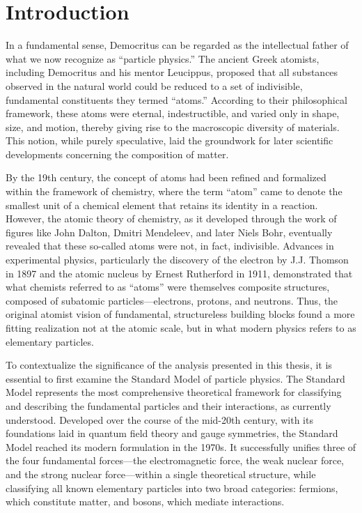 \chapter{Introduction} \label{chap:chap-1}




In a fundamental sense, Democritus can be regarded as the intellectual father of what we now recognize as ``particle physics.'' The ancient Greek atomists, including Democritus and his mentor Leucippus, proposed that all substances observed in the natural world could be reduced to a set of indivisible, fundamental constituents they termed ``atoms.'' According to their philosophical framework, these atoms were eternal, indestructible, and varied only in shape, size, and motion, thereby giving rise to the macroscopic diversity of materials. This notion, while purely speculative, laid the groundwork for later scientific developments concerning the composition of matter.

By the 19th century, the concept of atoms had been refined and formalized within the framework of chemistry, where the term ``atom'' came to denote the smallest unit of a chemical element that retains its identity in a reaction. However, the atomic theory of chemistry, as it developed through the work of figures like John Dalton, Dmitri Mendeleev, and later Niels Bohr, eventually revealed that these so-called atoms were not, in fact, indivisible. Advances in experimental physics, particularly the discovery of the electron by J.J. Thomson in 1897 and the atomic nucleus by Ernest Rutherford in 1911, demonstrated that what chemists referred to as ``atoms'' were themselves composite structures, composed of subatomic particles—electrons, protons, and neutrons. Thus, the original atomist vision of fundamental, structureless building blocks found a more fitting realization not at the atomic scale, but in what modern physics refers to as elementary particles.

To contextualize the significance of the analysis presented in this thesis, it is essential to first examine the Standard Model of particle physics. The Standard Model represents the most comprehensive theoretical framework for classifying and describing the fundamental particles and their interactions, as currently understood. Developed over the course of the mid-20th century, with its foundations laid in quantum field theory and gauge symmetries, the Standard Model reached its modern formulation in the 1970s. It successfully unifies three of the four fundamental forces—the electromagnetic force, the weak nuclear force, and the strong nuclear force—within a single theoretical structure, while classifying all known elementary particles into two broad categories: fermions, which constitute matter, and bosons, which mediate interactions.

